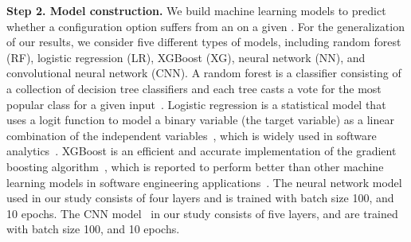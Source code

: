 \noindent\textbf{Step 2. Model construction.}
We build %
machine learning models to predict whether a configuration option suffers from an \inconsistent on a given \instance. %
For the generalization of our results, we consider five different types of models, including random forest (RF), logistic regression (LR), XGBoost (XG), neural network (NN), and convolutional neural network (CNN). %
A random forest is a classifier consisting of a collection of decision tree classifiers and each tree casts a vote for the most popular class for a given input~\cite{breiman2001random}. 
Logistic regression is a statistical model that uses a logit function to model a binary variable (the target variable) as a linear combination of the independent variables~\cite{hosmer2013applied}, which is widely used in software analytics~\cite{tantithamthavorn2018impact,shang2015automated}. 
XGBoost is an efficient and accurate implementation of the gradient boosting algorithm~\cite{chen2016xgboost}, which is reported to perform better than other machine learning models in software engineering applications~\cite{Liao2020LogPerfReg}.
The neural network model~\cite{DBLP:journals/jmlr/GlorotBB11} used in our study consists of four layers and is trained with batch size 100, and 10 epochs.
The CNN model~\cite{DBLP:journals/tnn/LawrenceGTB97} in our study consists of five layers, and are trained with batch size 100, and 10 epochs.



